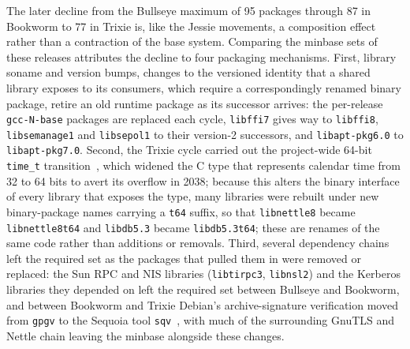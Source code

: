 The later decline from the Bullseye maximum of 95 packages through 87 in Bookworm to 77 in Trixie is, like the Jessie movements, a composition effect rather than a contraction of the base system. Comparing the minbase sets of these releases attributes the decline to four packaging mechanisms. First, library soname and version bumps, changes to the versioned identity that a shared library exposes to its consumers, which require a correspondingly renamed binary package, retire an old runtime package as its successor arrives: the per-release \texttt{gcc-N-base} packages are replaced each cycle, \texttt{libffi7} gives way to \texttt{libffi8}, \texttt{libsemanage1} and \texttt{libsepol1} to their version-2 successors, and \texttt{libapt-pkg6.0} to \texttt{libapt-pkg7.0}. Second, the Trixie cycle carried out the project-wide 64-bit \texttt{time\_t} transition~\cite{debianTrixieReleaseNotes,debian64bitTime}, which widened the C type that represents calendar time from 32 to 64 bits to avert its overflow in 2038; because this alters the binary interface of every library that exposes the type, many libraries were rebuilt under new binary-package names carrying a \texttt{t64} suffix, so that \texttt{libnettle8} became \texttt{libnettle8t64} and \texttt{libdb5.3} became \texttt{libdb5.3t64}; these are renames of the same code rather than additions or removals. Third, several dependency chains left the required set as the packages that pulled them in were removed or replaced: the Sun RPC and NIS libraries (\texttt{libtirpc3}, \texttt{libnsl2}) and the Kerberos libraries they depended on left the required set between Bullseye and Bookworm, and between Bookworm and Trixie Debian's archive-signature verification moved from \texttt{gpgv} to the Sequoia tool \texttt{sqv}~\cite{aptSequoia}, with much of the surrounding GnuTLS and Nettle chain leaving the minbase alongside these changes.

